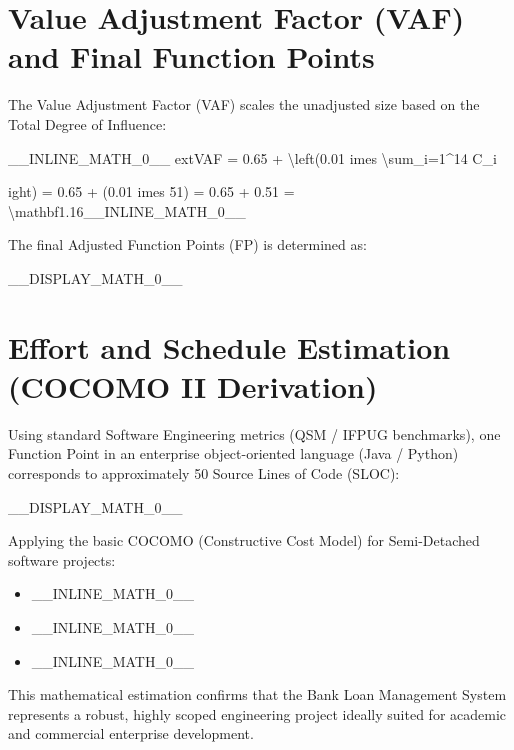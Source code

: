 \section{Value Adjustment Factor (VAF) and Final Function Points}

The Value Adjustment Factor (VAF) scales the unadjusted size based on the Total Degree of Influence:

\_\_INLINE\_MATH\_0\_\_	ext{VAF} = 0.65 + \textbackslash{}left(0.01 	imes \textbackslash{}sum\_{i=1}\textasciicircum{}{14} C\_i

ight) = 0.65 + (0.01 	imes 51) = 0.65 + 0.51 = \textbackslash{}mathbf{1.16}\_\_INLINE\_MATH\_0\_\_

The final Adjusted Function Points (FP) is determined as:

\_\_DISPLAY\_MATH\_0\_\_

\section{Effort and Schedule Estimation (COCOMO II Derivation)}

Using standard Software Engineering metrics (QSM / IFPUG benchmarks), one Function Point in an enterprise object-oriented language (Java / Python) corresponds to approximately 50 Source Lines of Code (SLOC):

\_\_DISPLAY\_MATH\_0\_\_

Applying the basic COCOMO (Constructive Cost Model) for Semi-Detached software projects:

\begin{itemize}
  \item \_\_INLINE\_MATH\_0\_\_
  \item \_\_INLINE\_MATH\_0\_\_
  \item \_\_INLINE\_MATH\_0\_\_
\end{itemize}

This mathematical estimation confirms that the Bank Loan Management System represents a robust, highly scoped engineering project ideally suited for academic and commercial enterprise development.
